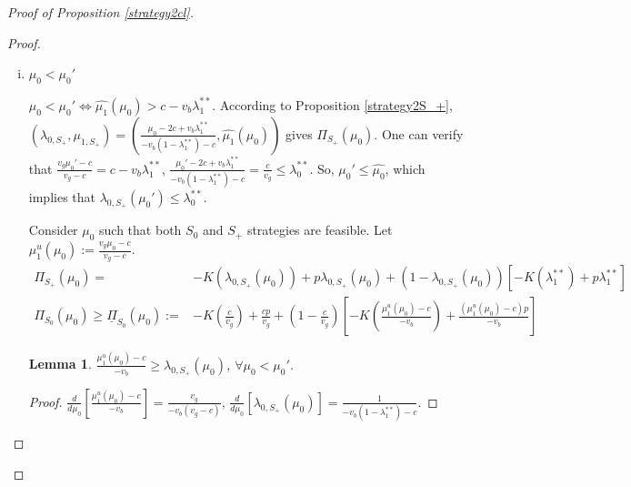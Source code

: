 \documentclass[11pt]{extarticle}
\newtheorem{lemma}{Lemma}
\newcommand{\lra}{\Leftrightarrow}
\newcommand{\m}{\wedge}
\begin{document}
\begin{proof}[Proof of Proposition \ref{strategy2cl}]
\begin{enumerate}[(1)]
\begin{proof}
\begin{enumerate}[i)]
				$\frac{(v_g-c)(c-v_b\lambda_1^{**})+c}{v_g}\leq \mu_0 \lra \widehat{\mu_1}(\mu_0) \leq c-v_b\lambda_1^{**}$. According to Proposition \ref{strategy2S_+}, $(\lambda_{0,S_+},\mu_{1,S_+}) = (\frac{\mu_0-2c +v_b \lambda_1^{**}}{-v_b(1-\lambda_1^{**})-c},c-v_b\lambda_1^{**})$ gives $\Pi_{S_+}(\mu_0)$. $\mu_1\in \left[\frac{c}{v_g}, \frac{v_g\mu_0-c}{v_g-c} \m c-v_b\lambda_1^{**} \right]$ in \eqref{P2S_0''} and $\frac{(v_g-c)(c-v_b\lambda_1^{**})+c}{v_g}\leq \mu_0 \lra \frac{v_g\mu_0-c}{v_g-c} \geq c-v_b\lambda_1^{**}$. Consider $(\lambda_0, \mu_1) = (\frac{\mu_0 - \mu_1 - c}{-v_b-\mu_1},c-v_b\lambda_{1}^{**})$, which satisfies the costraints in \eqref{P2S_0''} and is identical to $(\lambda_{0,S_+},\mu_{1,S_+})$. So, $\Pi_{S_0}(\mu_0) \geq \Pi_{S_+}(\mu_0)$.
				
				\item $\mu_0 < \mu_0'$
				
				$\mu_0 < \mu_0' \lra \widehat{\mu_1}(\mu_0) > c-v_b\lambda_1^{**}$. According to Proposition \ref{strategy2S_+}, $(\lambda_{0,S_+},\mu_{1,S_+}) = (\frac{\mu_0-2c +v_b \lambda_1^{**}}{-v_b(1-\lambda_1^{**})-c},\widehat{\mu_1}(\mu_0))$ gives $\Pi_{S_+}(\mu_0)$.	One can verify that $\frac{v_g\mu_0'-c}{v_g-c} = c-v_b\lambda_1^{**}$,  $\frac{\mu_0'-2c+v_b \lambda_1^{**}}{-v_b(1-\lambda_1^{**})-c} = \frac{c}{v_g}\leq \lambda_0^{**}$. So, $\mu_0' \leq \widehat{\mu_0}$, which implies that $\lambda_{0,S_+}(\mu_0') \leq \lambda_0^{**}$.
				
				Consider $\mu_0$ such that both $S_0$ and $S_+$ strategies are feasible. Let $\mu_1^u(\mu_0) := \frac{v_g\mu_0-c}{v_g-c}$.
				\begin{align*}
				\Pi_{S_+}(\mu_0) =& -K(\lambda_{0,S_+}(\mu_0))+p\lambda_{0,S_+}(\mu_0) +(1-\lambda_{0,S_+}(\mu_0))[-K(\lambda_1^{**})+p\lambda_1^{**}]\\
				\Pi_{S_0}(\mu_0)\geq \underline{\Pi}_{S_0}(\mu_0):=&-K(\frac{c}{v_g})+\frac{cp}{v_g}+(1-\frac{c}{v_g})\left[-K(\frac{\mu_1^u(\mu_0)-c}{-v_b})+\frac{(\mu_1^u(\mu_0)-c)p}{-v_b}\right]
				\end{align*}
				
				
				\begin{lemma}\label{lambda01comparison}
					$\frac{\mu_1^u(\mu_0)-c}{-v_b} \geq \lambda_{0,S_+}(\mu_0)$, $\forall \mu_0 < \mu_0'$.
				\end{lemma}
				\begin{proof}			
					$\frac{d}{d \mu_0} [\frac{\mu_1^u(\mu_0)-c}{-v_b}] = \frac{v_g}{-v_b(v_g-c)}$, $\frac{d}{d \mu_0} [\lambda_{0,S_+}(\mu_0)] = \frac{1}{-v_b(1-\lambda_1^{**})-c}$. 
					

\end{proof}
\end{enumerate}
\end{proof}
\end{enumerate}
\end{proof}
\end{document}
